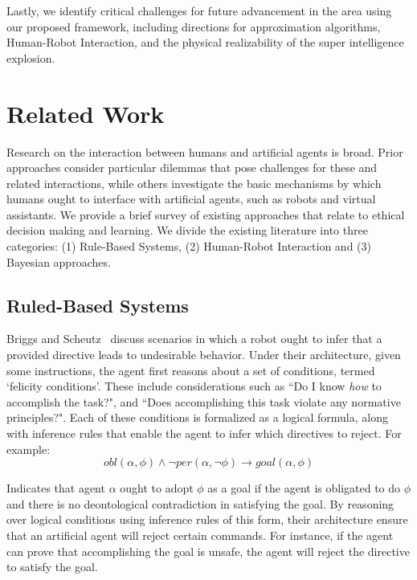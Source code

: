 \documentclass[11pt]{article}
\begin{document}
Lastly, we identify critical challenges for future advancement in the area using our proposed framework, including directions for approximation algorithms, Human-Robot Interaction, and the physical realizability of the super intelligence explosion.


\section{Related Work}

Research on the interaction between humans and artificial agents is broad. Prior approaches consider particular dilemmas that pose challenges for these and related interactions, while others investigate the basic mechanisms by which humans ought to interface with artificial agents, such as robots and virtual assistants. We provide a brief survey of existing approaches that relate to ethical decision making and learning. We divide the existing literature into three categories: (1) Rule-Based Systems, (2) Human-Robot Interaction and (3) Bayesian approaches.


\subsection{Ruled-Based Systems}

Briggs and Scheutz~ discuss scenarios in which a robot ought to infer that a provided directive leads to undesirable behavior. Under their architecture, given some instructions, the agent first reasons about a set of conditions, termed `felicity conditions'. These include considerations such as ``Do I know {\it how} to accomplish the task?", and ``Does accomplishing this task violate any normative principles?". Each of these conditions is formalized as a logical formula, along with inference rules that enable the agent to infer which directives to reject. For example:
\begin{equation}
obl(\alpha,\phi) \wedge \neg per(\alpha, \neg\phi) \rightarrow goal(\alpha, \phi)
\end{equation}

\noindent Indicates that agent $\alpha$ ought to adopt $\phi$ as a goal if the agent is obligated to do $\phi$ and there is no deontological contradiction in satisfying the goal. By reasoning over logical conditions using inference rules of this form, their architecture ensure that an artificial agent will reject certain commands. For instance, if the agent can prove that accomplishing the goal is unsafe, the agent will reject the directive to satisfy the goal.
\end{document}
